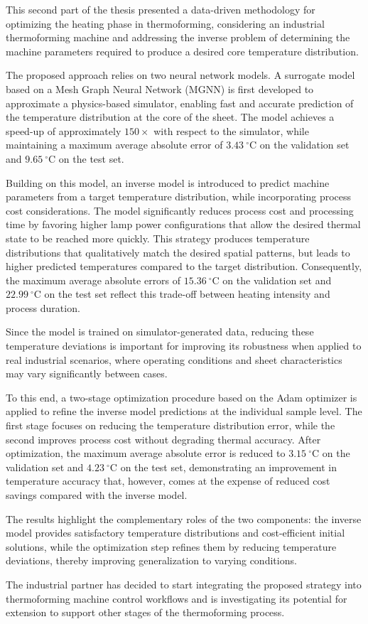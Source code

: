 \label{chap:pt2_conclusion}

This second part of the thesis presented a data-driven methodology for optimizing the heating phase in thermoforming, considering an industrial thermoforming machine and addressing the inverse problem of determining the machine parameters required to produce a desired core temperature distribution.


The proposed approach relies on two neural network models. A surrogate model based on a Mesh Graph Neural Network (MGNN) is first developed to approximate a physics-based simulator, enabling fast and accurate prediction of the temperature distribution at the core of the sheet. The model achieves a speed-up of approximately $150\times$ with respect to the simulator, while maintaining a maximum average absolute error of $3.43~^\circ\mathrm{C}$ on the validation set and $9.65~^\circ\mathrm{C}$ on the test set.

Building on this model, an inverse model is introduced to predict machine parameters from a target temperature distribution, while incorporating process cost considerations. The model significantly reduces process cost and processing time by favoring higher lamp power configurations that allow the desired thermal state to be reached more quickly. This strategy produces temperature distributions that qualitatively match the desired spatial patterns, but leads to higher predicted temperatures compared to the target distribution. Consequently, the maximum average absolute errors of $15.36~^\circ\mathrm{C}$ on the validation set and $22.99~^\circ\mathrm{C}$ on the test set reflect this trade-off between heating intensity and process duration.

Since the model is trained on simulator-generated data, reducing these temperature deviations is important for improving its robustness when applied to real industrial scenarios, where operating conditions and sheet characteristics may vary significantly between cases.

To this end, a two-stage optimization procedure based on the Adam optimizer is applied to refine the inverse model predictions at the individual sample level. The first stage focuses on reducing the temperature distribution error, while the second improves process cost without degrading thermal accuracy. After optimization, the maximum average absolute error is reduced to $3.15~^\circ\mathrm{C}$ on the validation set and $4.23~^\circ\mathrm{C}$ on the test set, demonstrating an improvement in temperature accuracy that, however, comes at the expense of reduced cost savings compared with the inverse model.

The results highlight the complementary roles of the two components: the inverse model provides satisfactory temperature distributions and cost-efficient initial solutions, while the optimization step refines them by reducing temperature deviations, thereby improving generalization to varying conditions.

The industrial partner has decided to start integrating the proposed strategy into thermoforming machine control workflows and is investigating its potential for extension to support other stages of the thermoforming process.